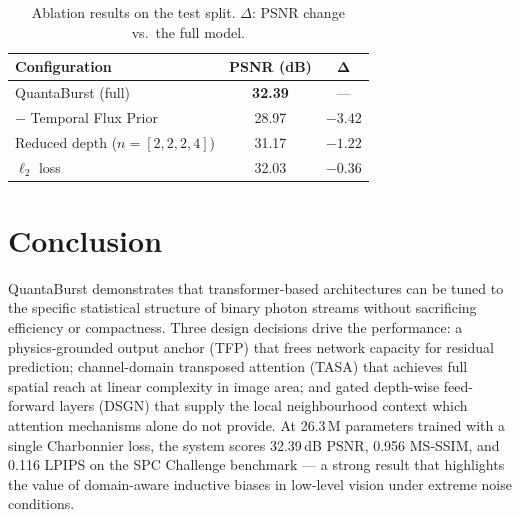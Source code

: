 \documentclass[10pt,twocolumn,letterpaper]{article}
\begin{document}
\begin{table}[t]
  \centering
  \small
  \caption{Ablation results on the test split.
    $\Delta$: PSNR change vs.\ the full model.}
  \label{tab:ablation}
  \setlength{\tabcolsep}{4pt}
  \begin{tabular}{lcc}
    \toprule
    \textbf{Configuration} & \textbf{PSNR (dB)} & $\mathbf{\Delta}$ \\
    \midrule
    QuantaBurst (full)              & \textbf{32.39} & ---     \\
    \midrule
    $-$ Temporal Flux Prior         & 28.97 & $-3.42$ \\
    Reduced depth ($n{=}[2,2,2,4]$) & 31.17 & $-1.22$ \\
    $\ell_2$ loss                   & 32.03 & $-0.36$ \\
    \bottomrule
  \end{tabular}
\end{table}

\section{Conclusion}

QuantaBurst demonstrates that transformer-based architectures can
be tuned to the specific statistical structure of binary photon
streams without sacrificing efficiency or compactness.
Three design decisions drive the performance:
a physics-grounded output anchor (TFP) that frees network capacity
for residual prediction;
channel-domain transposed attention (TASA) that achieves full
spatial reach at linear complexity in image area;
and gated depth-wise feed-forward layers (DSGN) that supply the
local neighbourhood context which attention mechanisms alone
do not provide.
At 26.3\,M parameters trained with a single Charbonnier loss,
the system scores 32.39\,dB PSNR, 0.956 MS-SSIM, and 0.116 LPIPS
on the SPC Challenge benchmark --- a strong result that highlights
the value of domain-aware inductive biases in low-level vision
under extreme noise conditions.
\end{document}
